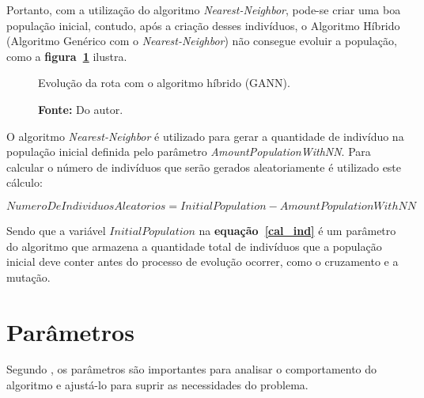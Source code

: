\documentclass[12pt,openright,a4paper,oneside]{tcc}
\begin{document}
		Portanto, com a utilização do algoritmo \textit{Nearest-Neighbor}, pode-se criar uma boa população inicial, contudo, após a criação desses indivíduos, o Algoritmo Híbrido (Algoritmo Genérico com o  \textit{Nearest-Neighbor}) não consegue evoluir a população, como a \textbf{figura~\ref{figagnn}} ilustra.  

		\begin{figure}[h]
			\centering
            \caption{Evolução da rota com o algoritmo híbrido (GANN).}
			\caption*{\textbf{Fonte:} Do autor.}
			\label{figagnn}
		\end{figure}


		O algoritmo \textit{Nearest-Neighbor} é utilizado para gerar a quantidade de indivíduo na população inicial definida pelo parâmetro \textit{AmountPopulationWithNN}. Para calcular o número de indivíduos que serão gerados aleatoriamente é utilizado este cálculo:

			\begin{equation}
				\label{cal_ind}
		 		NumeroDeIndividuosAleatorios = InitialPopulation - AmountPopulationWithNN 
		 	\end{equation} 
		
		Sendo que a variável $InitialPopulation$ na \textbf{equação~\ref{cal_ind}} é um parâmetro do algoritmo que armazena a quantidade total de indivíduos que a população inicial deve conter antes do processo de evolução ocorrer, como o cruzamento e a mutação.

        \section{Parâmetros}
        
        Segundo , os parâmetros são importantes para analisar o comportamento do algoritmo e ajustá-lo para suprir as necessidades do problema. 
        
\end{document}
